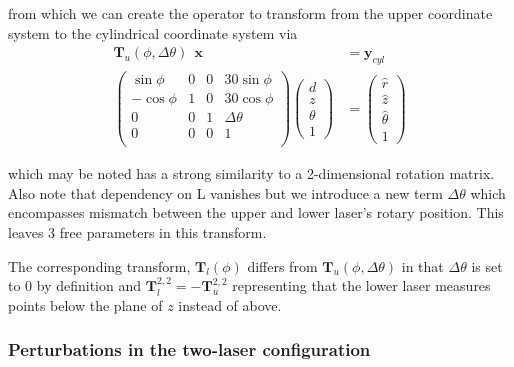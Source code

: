 from which we can create the operator to transform from the upper
coordinate system to the cylindrical coordinate system via
\begin{align}
  \mathbf{T}_{u}(\phi, \Delta \theta)\ \  \mathbf{x} &= \mathbf{y}_{cyl} \\
  \left(
    \begin{array}{cccc}
      \sin\phi  & 0 & 0 & 30 \sin\phi   \\
      -\cos\phi & 1 & 0 & 30 \cos\phi   \\
      0         & 0 & 1 & \Delta \theta \\
      0         & 0 & 0 & 1             \\ 
    \end{array}
  \right)
  \left(
    \begin{array}{c}
      d \\ z \\ \theta \\ 1
    \end{array}
  \right)
  &=
  \left(
    \begin{array}{c}
      \hat{r} \\ \hat{z} \\ \hat{\theta} \\ 1
    \end{array}
  \right)  
\end{align}

which may be noted has a strong similarity to a 2-dimensional rotation
matrix. Also note that dependency on L vanishes but we introduce a new
term $\Delta\theta$ which encompasses mismatch between the upper and
lower laser's rotary position. This leaves 3 free parameters in this
transform.

The corresponding transform, $\mathbf{T}_{l}(\phi)$ differs from
$\mathbf{T}_{u}(\phi, \Delta\theta)$ in that $\Delta\theta$ is set to
0 by definition and $\mathbf{T}_{l}^{2,2} = -\mathbf{T}_{u}^{2,2}$
representing that the lower laser measures points below the plane of
$z$ instead of above.

\subsubsection{Perturbations in the two-laser configuration}
\label{sec:pert-two-laser}

